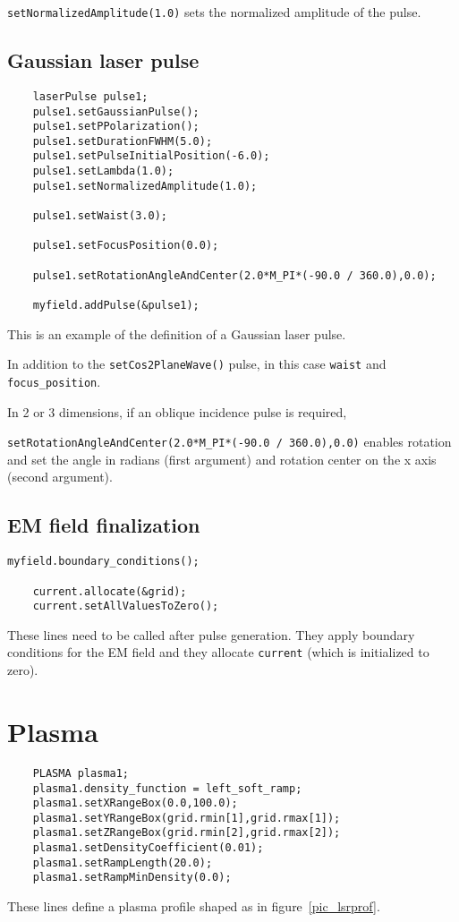 \documentclass[11pt,a4paper]{report}
\begin{document}
\verb+setNormalizedAmplitude(1.0)+ sets the normalized amplitude of the pulse.


\subsection{Gaussian laser pulse}
\begin{lstlisting}
	laserPulse pulse1;
	pulse1.setGaussianPulse();
   	pulse1.setPPolarization();
   	pulse1.setDurationFWHM(5.0);
   	pulse1.setPulseInitialPosition(-6.0);
   	pulse1.setLambda(1.0);
   	pulse1.setNormalizedAmplitude(1.0);

	pulse1.setWaist(3.0);

   	pulse1.setFocusPosition(0.0);

	pulse1.setRotationAngleAndCenter(2.0*M_PI*(-90.0 / 360.0),0.0);

	myfield.addPulse(&pulse1);
\end{lstlisting}
This is an example of the definition of a Gaussian laser pulse.

In addition to the \verb+setCos2PlaneWave()+ pulse, in this case \verb+waist+ and \verb+focus_position+.

In 2 or 3 dimensions, if an oblique incidence pulse is required,

\verb+setRotationAngleAndCenter(2.0*M_PI*(-90.0 / 360.0),0.0)+ enables rotation and set the angle in radians (first argument) and rotation center on the x axis (second argument).
\subsection{EM field finalization}
\begin{lstlisting}[backgroundcolor=\color{no_modify}]
	myfield.boundary_conditions();

	current.allocate(&grid);
	current.setAllValuesToZero();
\end{lstlisting}
These lines need to be called after pulse generation. They apply boundary conditions for the EM field and they allocate \verb+current+ (which is initialized to zero).

\section{Plasma}
\begin{lstlisting}
	PLASMA plasma1;
	plasma1.density_function = left_soft_ramp;
	plasma1.setXRangeBox(0.0,100.0);
	plasma1.setYRangeBox(grid.rmin[1],grid.rmax[1]);
	plasma1.setZRangeBox(grid.rmin[2],grid.rmax[2]);
	plasma1.setDensityCoefficient(0.01);
	plasma1.setRampLength(20.0);
	plasma1.setRampMinDensity(0.0);
\end{lstlisting}
These lines define a plasma profile shaped as in figure~\ref{pic_lsrprof}.
\end{document}
